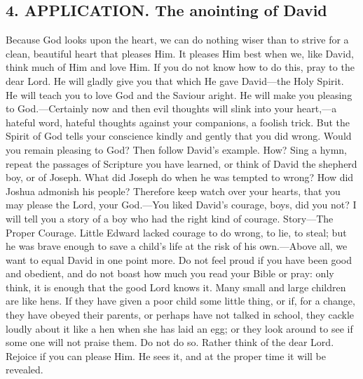 \subsection{4. APPLICATION. The anointing of David} Because God looks upon the heart, we can do nothing wiser than to strive for a clean, beautiful heart that pleases Him. It pleases Him best when we, like David, think much of Him and love Him. If you do not know how to do this, pray to the dear Lord. He will gladly give you that which He gave David—the Holy Spirit. He will teach you to love God and the Saviour aright. He will make you pleasing to God.—Certainly now and then evil thoughts will slink into your heart,—a hateful word, hateful thoughts against your companions, a foolish trick. But the Spirit of God tells your conscience kindly and gently that you did wrong. Would you remain pleasing to God? Then follow David’s example. How? Sing a hymn, repeat the passages of Scripture you have learned, or think of David the shepherd boy, or of Joseph. What did Joseph do when he was tempted to wrong? How did Joshua admonish his people? Therefore keep watch over your hearts, that you may please the Lord, your God.—You liked David’s courage, boys, did you not? I will tell you a story of a boy who had the right kind of courage. Story—The Proper Courage. Little Edward lacked courage to do wrong, to lie, to steal; but he was brave enough to save a child’s life at the risk of his own.—Above all, we want to equal David in one point more. Do not feel proud if you have been good and obedient, and do not boast how much you read your Bible or pray: only think, it is enough that the good Lord knows it. Many small and large children are like hens. If they have given a poor child some little thing, or if, for a change, they have obeyed their parents, or perhaps have not talked in school, they cackle loudly about it like a hen when she has laid an egg; or they look around to see if some one will not praise them. Do not do so. Rather think of the dear Lord. Rejoice if you can please Him. He sees it, and at the proper time it will be revealed.

